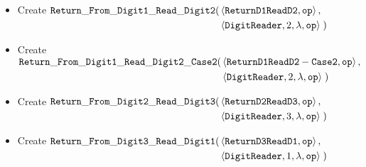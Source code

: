 \begin{itemize}
    \item Create
    $\begin{aligned}[t]
        {\tt Return\_From\_Digit1\_Read\_Digit2}(& \left \langle {\tt ReturnD1ReadD2},          {\tt op} \right\rangle, \\
                                & \left \langle {\tt DigitReader}, 2, \lambda, {\tt op} \right\rangle \;)
    \end{aligned}$

    \item Create
    $\begin{aligned}[t]
        {\tt Return\_From\_Digit1\_Read\_Digit2\_Case2}(& \left \langle {\tt ReturnD1ReadD2-Case2},    {\tt op} \right\rangle, \\
                                        & \left \langle {\tt DigitReader}, 2, \lambda, {\tt op} \right\rangle \;)
    \end{aligned}$

    \item Create
    $\begin{aligned}[t]
        {\tt Return\_From\_Digit2\_Read\_Digit3}(& \left \langle {\tt ReturnD2ReadD3},             {\tt op} \right\rangle, \\
                                    & \left \langle {\tt DigitReader},  3, \lambda, {\tt op} \right\rangle \;)
    \end{aligned}$

    \item Create
    $\begin{aligned}[t]
            {\tt Return\_From\_Digit3\_Read\_Digit1}(& \left \langle {\tt ReturnD3ReadD1},           {\tt op} \right\rangle, \\
                                    & \left \langle {\tt DigitReader},  1, \lambda,   {\tt op} \right\rangle \;)
    \end{aligned}$

\end{itemize}

